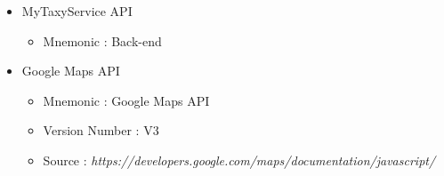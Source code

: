 \documentclass[12pt, a4paper]{article}
\begin{document}
\begin{itemize}
	\item MyTaxyService API
	\begin{itemize}
		\item Mnemonic : Back-end
	\end{itemize}
	\item Google Maps API
	\begin{itemize}
		\item Mnemonic : Google Maps API
		\item Version Number : V3
		\item Source : \emph{https://developers.google.com/maps/documentation/javascript/} 
	\end{itemize}

\end{itemize}
\end{document}
